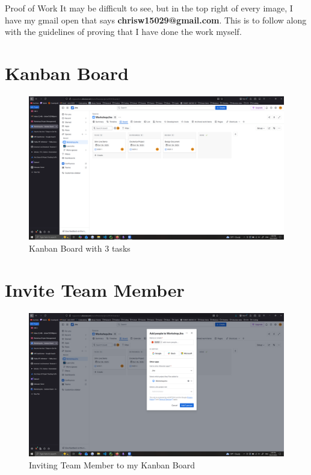 \documentclass[12pt]{article}
\begin{document}
\maketitlepage

\begin{important}{Proof of Work}
    It may be difficult to see, but in the top right of every image, I have my gmail open that says \textbf{chrisw15029@gmail.com}. This is to follow along with the guidelines of proving that I have done the work myself.
\end{important}

\section{Kanban Board}

\begin{figure}[H]
    \centering
    \includegraphics[width=0.75\linewidth]{images/kanban_board_q1.png}
    \caption{Kanban Board with 3 tasks}\label{fig:q1}
\end{figure}

\section{Invite Team Member}

\begin{figure}[H]
    \centering
    \includegraphics[width=0.75\linewidth]{images/project_invite_q2.png}
    \caption{Inviting Team Member to my Kanban Board}\label{fig:q2}
\end{figure}
\end{document}
